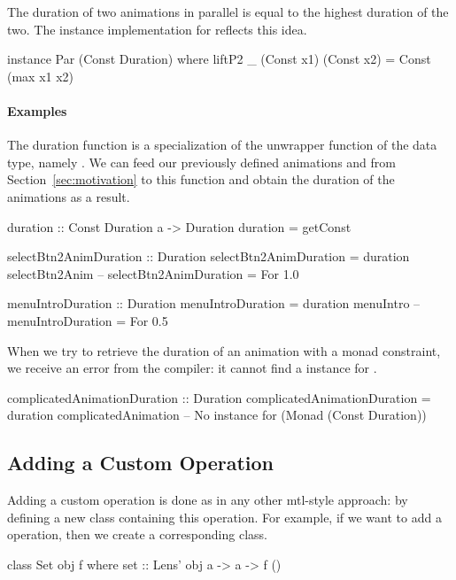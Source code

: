 The duration of two animations in parallel is equal to the highest duration of the two. The  instance implementation for  reflects this idea. 

\begin{code}
instance Par (Const Duration) where
  liftP2 _ (Const x1) (Const x2) = Const (max x1 x2)
\end{code}

\paragraph{Examples}

The duration function is a specialization of the unwrapper function of the  data type, namely . We can feed our previously defined animations  and  from Section~\ref{sec:motivation} to this function and obtain the duration of the animations as a result.

\begin{code}
duration :: Const Duration a -> Duration
duration = getConst

selectBtn2AnimDuration :: Duration
selectBtn2AnimDuration = duration selectBtn2Anim
-- selectBtn2AnimDuration = For 1.0

menuIntroDuration :: Duration
menuIntroDuration = duration menuIntro
-- menuIntroDuration = For 0.5
\end{code}

When we try to retrieve the duration of an animation with a monad constraint, we receive an error from the compiler: it cannot find a  instance for .

\begin{spec}
complicatedAnimationDuration :: Duration
complicatedAnimationDuration = duration complicatedAnimation
-- No instance for (Monad (Const Duration))
\end{spec}

\subsection{Adding a Custom Operation}

Adding a custom operation is done as in any other mtl-style approach: by defining a new class containing this operation. For example, if we want to add a  operation, then we create a corresponding  class.

\begin{code}
class Set obj f where set :: Lens' obj a -> a -> f ()
\end{code}

